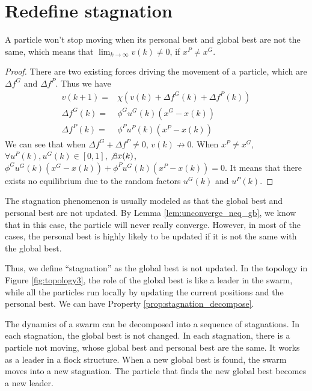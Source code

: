 

\section{Redefine stagnation}

\begin{lemma}
\label{lem:unconverge_neq_gb}
A particle won't stop moving when its personal best and global best are not the same, 
which means that 
$ \lim_{k \rightarrow \infty} v(k) \neq 0 $, if $ x^{P} \neq x^{G} $.
\begin{proof} 
There are two existing forces driving the movement of a particle, which are $ \Delta f^{G} $ and $ \Delta f^{P} $.
Thus we have
\begin{equation}
\begin{array}{lcl}
v(k+1) = & \chi ( v(k) + \Delta f^{G} (k) + \Delta f^{P} (k) ) \\
\Delta f^{G} (k) = & \phi^{G} u^{G} (k) (x^{G} - x(k)) \\
\Delta f^{P} (k) = & \phi^{P} u^{P} (k) (x^{P} - x(k)) 
\end{array}
\end{equation}
We can see that when $ \Delta f^{G} + \Delta f^{P} \neq 0 $, $ v(k)  \not \rightarrow 0 $.
When $ x^{P} \neq x^{G} $, $ \forall u^{P}(k), u^{G}(k) \in [0, 1] $, $ \not \exists x(k) $, $ \phi^{G} u^{G} (k) (x^{G} - x(k)) + \phi^{P} u^{G} (k) (x^{P} - x(k)) = 0 $.
It means that there exists no equilibrium due to the random factors $ u^{G} (k) $ and $ u^{P} (k) $. 
\end{proof}
\end{lemma}

The stagnation phenomenon is usually modeled as that the global best and personal best are not updated.
By Lemma \ref{lem:unconverge_neq_gb}, we know that in this case, the particle will never really converge.
However, in most of the cases, the personal best is highly likely to be updated if it is not the same with the global best.

Thus, we define ``stagnation'' as the global best is not updated.
In the topology in Figure \ref{fig:topology3}, the role of the global best is like a leader in the swarm, while all the particles run locally by updating the current positions and the personal best.
We can have Property \ref{prop:stagnation_decompose}.

\begin{property}
\label{prop:stagnation_decompose}
The dynamics of a swarm can be decomposed into a sequence of stagnations.
In each stagnation, the global best is not changed.
In each stagnation, there is a particle not moving, whose global best and personal best are the same.
It works as a leader in a flock structure.
When a new global best is found, the swarm moves into a new stagnation.
The particle that finds the new global best becomes a new leader.
\end{property}

